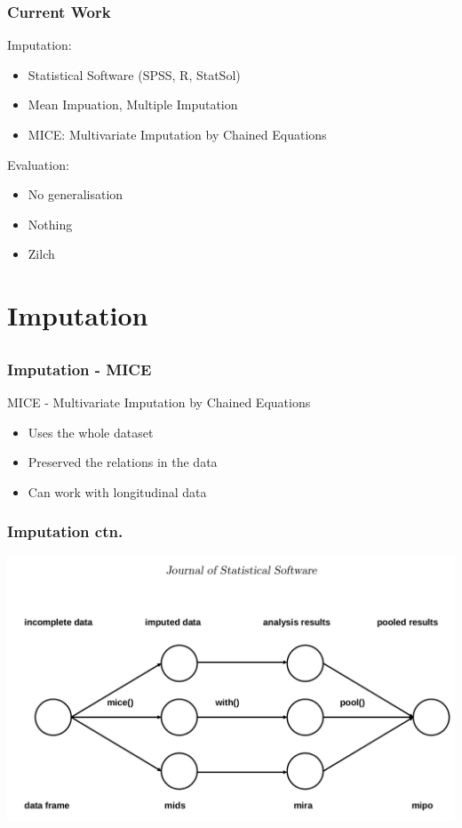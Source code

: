 \documentclass{beamer}
\begin{document}
\begin{frame}
  \frametitle{Current Work}
  Imputation:
  \begin{itemize}
    \item Statistical Software (SPSS, R, StatSol)
    \item Mean Impuation, Multiple Imputation
    \item MICE: Multivariate Imputation by Chained Equations
  \end{itemize}
  Evaluation:
  \begin{itemize}
    \item No generalisation 
    \item Nothing
    \item Zilch
  \end{itemize}
\end{frame}

\section{Imputation}
\subsection{}

\begin{frame}
  \frametitle{Imputation - MICE}
  MICE - Multivariate Imputation by Chained Equations 
  \begin{itemize}
    \item Uses the whole dataset 
    \item Preserved the relations in the data
    \item Can work with longitudinal data 
  \end{itemize}
\end{frame}

\begin{frame}
  \frametitle{Imputation ctn.} 
  \centerline{\includegraphics[width=\paperwidth]{mice}}
\end{frame}
\end{document}
